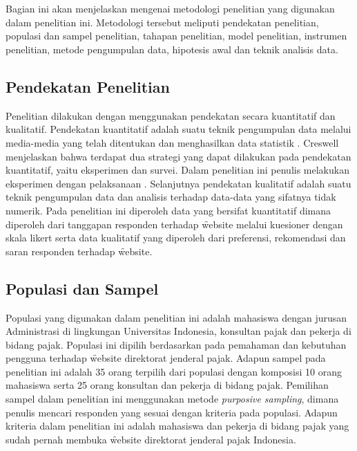\chapter{\babTiga}
Bagian ini akan menjelaskan mengenai metodologi penelitian yang digunakan dalam penelitian ini. Metodologi tersebut meliputi pendekatan penelitian, populasi dan sampel penelitian, tahapan penelitian, model penelitian, instrumen penelitian, metode pengumpulan data, hipotesis awal dan teknik analisis data.
\section{Pendekatan Penelitian}
Penelitian dilakukan dengan menggunakan pendekatan secara kuantitatif dan kualitatif. Pendekatan kuantitatif adalah suatu teknik pengumpulan data melalui media-media yang telah ditentukan dan menghasilkan data statistik \citep{buku.creswell}. Creswell menjelaskan bahwa terdapat dua strategi yang dapat dilakukan pada pendekatan kuantitatif, yaitu eksperimen dan survei. Dalam penelitian ini penulis melakukan eksperimen dengan pelaksanaan \ust. Selanjutnya pendekatan kualitatif adalah suatu teknik pengumpulan data dan analisis terhadap data-data yang sifatnya tidak numerik. Pada penelitian ini diperoleh data yang bersifat kuantitatif dimana diperoleh dari tanggapan responden terhadap \f{website} melalui kuesioner dengan skala likert serta data kualitatif yang diperoleh dari preferensi, rekomendasi dan saran responden terhadap \f{website}.
\section{Populasi dan Sampel}
Populasi yang digunakan dalam penelitian ini adalah mahasiswa dengan jurusan Administrasi di lingkungan Universitas Indonesia, konsultan pajak dan pekerja di bidang pajak. Populasi ini dipilih berdasarkan pada pemahaman dan kebutuhan pengguna terhadap \f{website} direktorat jenderal pajak. Adapun sampel pada penelitian ini adalah 35 orang terpilih dari populasi dengan komposisi 10 orang mahasiswa serta 25 orang konsultan dan pekerja di bidang pajak. Pemilihan sampel dalam penelitian ini menggunakan metode \textit{purposive sampling}, dimana penulis mencari responden yang sesuai dengan kriteria pada populasi. Adapun kriteria dalam penelitian ini adalah mahasiswa dan pekerja di bidang pajak yang sudah pernah membuka \f{website} direktorat jenderal pajak Indonesia.
